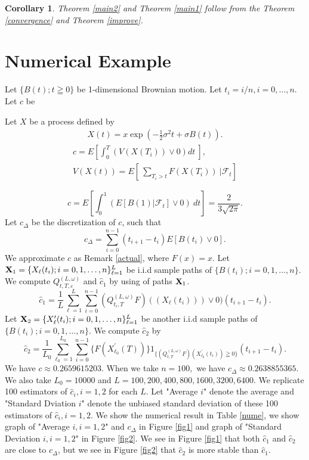\documentclass[12pt]{article}
\newtheorem{cor}[thm]{Corollary}%
\begin{document}
\begin{cor}

Theorem \ref{main2} and
Theorem \ref{main1} follow from the Theorem \ref{convergence} and Theorem \ref{improve}.

\end{cor}

\section{Numerical Example}\label{sec:nume}
Let $\{B(t); t\geqq 0\} $ be 1-dimensional Brownian motion.
Let $t_i = i/n, i=0,\ldots, n.$ Let $c$ be

Let $X$ be a process defined by 
\begin{align}
  X(t) = x \exp\left( - \frac{1}{2} \sigma^2 t + \sigma B(t)  \right).
\end{align}
\begin{align}
  c = E\left[\int_0^T  \left(V(X(T_i)) \vee 0 \right) dt \ \right], \\
  V(X(t)) = E\left[\ \sum_{T_i>t}F(X(T_i)) \ | \mathcal{F}_t \right]
\end{align}


$$c=E [\int_0^1( E[B(1)|\mathcal{F}_t]\vee0 )\ dt ]=\frac{2}{3 \sqrt{2\pi}}.$$
Let $c_{\Delta}$ be the discretization of $c$, such that
$$
c_{\Delta}=\sum_{i=0}^{n-1}(t_{i+1}-t_i)E[B(t_i)\vee0].
$$
We approximate $c$  as Remark \ref{actual}, where $F(x) =x.$ Let
${\bf X}_1 = \{X_{\ell }(t_i); i=0,1,\ldots,n \}_{\ell=1}^L$
be i.i.d sample paths of $\{B(t_i); i=0,1,\ldots,n\} $.
We compute
 $Q_{t,T,\varepsilon}^{(L,\omega)}$ and $\hat{c}_1$ by using of paths ${\bf X}_1$.
$$\hat{c}_1=\frac{1}{L} \sum_{\ell=1}^L \sum_{i=0}^{n-1} (Q_{t_i,T}^{(L,\omega)}F)((X_{\ell}(t_i)))\vee0)(t_{i+1}-t_i). $$
Let ${\bf X}_2 = \{X'_{\ell }(t_i); i=0,1,\ldots,n \}_{\ell=1}^L$
be another i.i.d sample paths of $\{B(t_i); i=0,1,\ldots,n\} $.
We compute $\hat{c}_2$ by 
 $$\hat{c}_2= \frac{1}{L_0} \sum_{\ell_0=1}^{L_0} \sum_{i=0}^{n-1} \{ F(X_{\ell_0}^{'}(T))\}
 1_{\{(Q_{t,T}^{(L,\omega)}F)(X^{'}_{\ell_0}(t_i)) \geqq 0\}}(t_{i+1}-t_i).$$ 
We have $c\approx 0.2659615203.$ When we take $n = 100,$ we have $c_{\Delta}\approx 0.2638855365.$ 
We also take $L_0=10000$ and $L=100, 200, 400, 800, 1600, 3200, 6400.$ 
We replicate 100 estimators of $\hat{c}_i, i=1,2$ for each $L$. Let "Average $i$" denote the average and "Standard Dviation $i$" denote
 the unbiased standard deviation of these 100 estimators of $\hat{c}_i, i=1,2.$ We show the numerical result in Table \ref{nume}, 
we show graph of "Average $i, i = 1,2$" and $c_{\Delta}$ in Figure \ref{fig1} and graph of "Standard Deviation $i, i=1,2$" in Figure \ref{fig2}.
\noindent 
We see in Figure \ref{fig1} that both $\hat{c}_1$ and $\hat{c}_2$ are close to $c_{\Delta}$,
but we see in Figure \ref{fig2} that $\hat{c}_2$ is more stable than $\hat{c}_1.$
\end{document}
